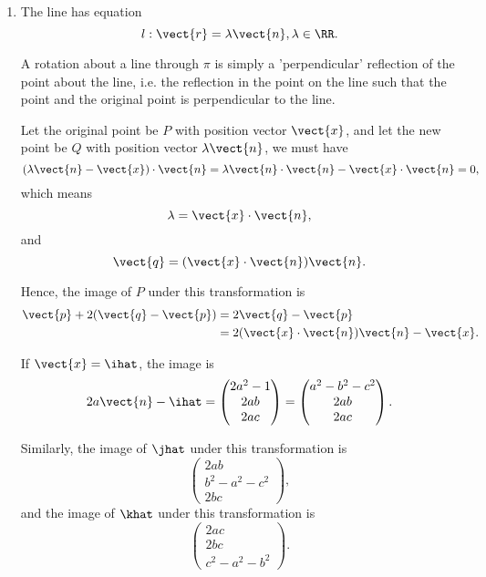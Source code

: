 \begin{enumerate}
    \item The line has equation
          \[
              l: \vect{r} = \lambda \vect{n}, \lambda \in \RR.
          \]

          A rotation about a line through \(\pi\) is simply a 'perpendicular' reflection of the point about the line, i.e. the reflection in the point on the line such that the point and the original point is perpendicular to the line.

          Let the original point be \(P\) with position vector \(\vect{x}\), and let the new point be \(Q\) with position vector \(\lambda \vect{n}\), we must have
          \[
              \left(\lambda \vect{n} - \vect{x}\right) \cdot \vect{n} = \lambda \vect{n} \cdot \vect{n} - \vect{x} \cdot \vect{n} = 0,
          \]
          which means
          \[
              \lambda = \vect{x} \cdot \vect{n},
          \]
          and
          \[
              \vect{q} = (\vect{x} \cdot \vect{n}) \vect{n}.
          \]

          Hence, the image of \(P\) under this transformation is
          \begin{align*}
              \vect{p} + 2(\vect{q} - \vect{p}) & = 2 \vect{q} - \vect{p}                            \\
                                                & = 2 (\vect{x} \cdot \vect{n}) \vect{n} - \vect{x}.
          \end{align*}

          If \(\vect{x} = \ihat\), the image is
          \[
              2 a \vect{n} - \ihat = \begin{pmatrix}
                  2a^2 - 1 \\
                  2ab      \\
                  2ac
              \end{pmatrix} = \begin{pmatrix}
                  a^2 - b^2 - c^2 \\
                  2ab             \\
                  2ac
              \end{pmatrix}.
          \]

          Similarly, the image of \(\jhat\) under this transformation is
          \[
              \begin{pmatrix}
                  2ab             \\
                  b^2 - a^2 - c^2 \\
                  2bc
              \end{pmatrix},
          \]
          and the image of \(\khat\) under this transformation is
          \[
              \begin{pmatrix}
                  2ac \\
                  2bc \\
                  c^2 - a^2 - b^2
              \end{pmatrix}.
          \]


\end{enumerate}
